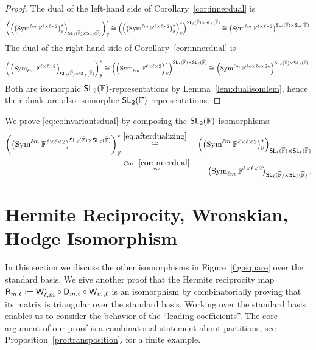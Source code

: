 \documentclass[a4paper]{extarticle}
\newcommand{\IF}{\mathbb{F}}
\newcommand{\oIF}{{\overline{\mathbb{F}}}}
\newcommand{\SL}{\textsf{\textup{SL}}}
\newcommand{\Sym}{\textup{Sym}}
\newcommand{\Hodge}{\textsf{\textup{D}}}
\newcommand{\Wronski}{\textsf{\textup{W}}}
\newcommand{\Hermite}{\textsf{\textup{R}}}
\numberwithin{theorem}{section}
\theoremstyle{definition}
\begin{document}
\begin{proof}
The dual of the left-hand side of Corollary~\ref{cor:innerdual} is
\[
\left(
\Big(\big(\Sym^{\ell m} \:\IF^{\ell \times\ell \times 2}\big)^\star_\IF\Big)_{\SL_\ell(\oIF)\times \SL_\ell(\oIF)}
\right)_\IF^\ast
\cong
\left(
\Big(\big(\Sym^{\ell m} \:\IF^{\ell \times\ell \times 2}\big)^\star_\IF\Big)_\IF^\ast
\right)^{\SL_\ell(\oIF)\times \SL_\ell(\oIF)}
\cong
\big(\Sym^{\ell m} \:\IF^{\ell \times\ell \times 2}\big)^{\SL_\ell(\oIF)\times \SL_\ell(\oIF)}.
\]
The dual of the right-hand side of Corollary~\ref{cor:innerdual} is
\[
\left(
\Big(\Sym_{\ell m} \:\IF^{\ell \times\ell \times 2}\Big)_{\SL_\ell(\oIF)\times \SL_\ell(\oIF)}
\right)^\star_\IF
\cong
\left(
\Big(\Sym_{\ell m} \:\IF^{\ell \times\ell \times 2}\Big)^\star_\IF\right)^{\SL_\ell(\oIF)\times \SL_\ell(\oIF)}
\cong
\Big(\Sym^{\ell m} \:\IF^{\ell\star \times\ell\star \times 2\star}\Big)^{\SL_\ell(\oIF)\times \SL_\ell(\oIF)}.
\]
Both are isomorphic $\SL_2(\IF)$-representations by Lemma~\ref{lem:dualisomlem}, hence their duals are also isomorphic $\SL_2(\IF)$-representations.
\end{proof}
We prove \eqref{eq:coinvariantsdual} by composing the $\SL_2(\IF)$-isomorphisms:
\begin{eqnarray}
\left(\big(\Sym^{\ell m}\:\IF^{\ell\times\ell\times 2}\big)^{\SL_\ell(\oIF)\times \SL_\ell(\oIF)}\right)^\star_\IF
&\stackrel{\eqref{eq:afterdualizing}}{\cong}&
\left(\big(\Sym^{\ell m}\:\IF^{\ell\times\ell\times 2}\big)^\star_\IF\right)_{\SL_\ell(\oIF)\times \SL_\ell(\oIF)}
\nonumber\\
&\stackrel{\textup{Cor.}~\ref{cor:innerdual}}{\cong}&
\left(\Sym_{\ell m}\:\IF^{\ell\times\ell\times 2}\right)_{\SL_\ell(\oIF)\times \SL_\ell(\oIF)}.
\label{eq:coinvariants}\end{eqnarray}




\section{Hermite Reciprocity, Wronskian, Hodge Isomorphism}
\label{sec:isos}
In this section we discuss the other isomorphisms in Figure~\ref{fig:square} over the standard basis.
We give another proof that the Hermite reciprocity map $\Hermite_{m,\ell} := \Wronski_{\ell,m}^\star\circ \Hodge_{m,\ell} \circ \Wronski_{m,\ell}$ is an isomorphism by combinatorially proving that its matrix is triangular over the standard basis.
Working over the standard basis enables us to consider the behavior of the ``leading coefficients''.
The core argument of our proof is a combinatorial statement about partitions,
see Proposition~\ref{pro:transposition}.
\cite[Exa.~5.1]{MW:22} for a finite example.
\end{document}
